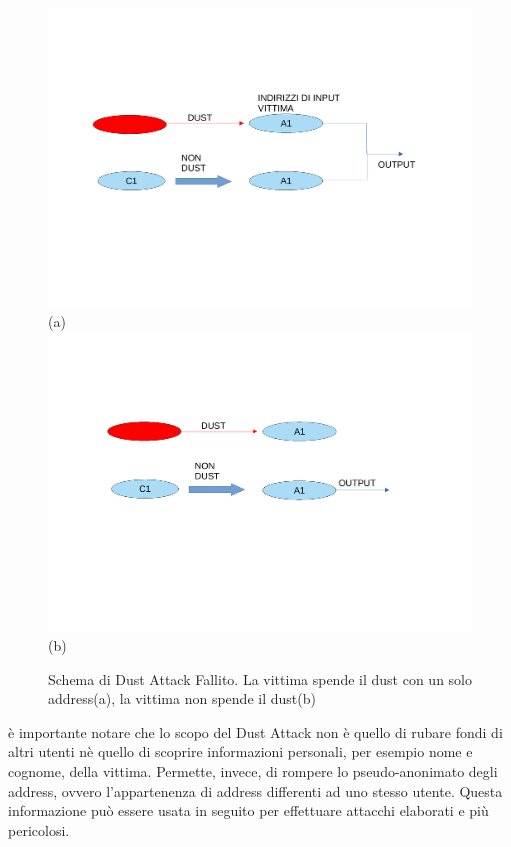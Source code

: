 \begin{figure}[h!]
    \centering
    \includegraphics[scale=0.5, trim = 1cm 6cm 0cm 3cm, clip]{Images/fallito2.pdf}
    (a)
    \includegraphics[scale=0.5, trim = 1cm 7cm 0cm 2cm, clip]{Images/fallito1.pdf}
    (b)
    \caption{Schema di Dust Attack Fallito. La vittima spende il dust con un solo address(a), la vittima non spende il dust(b)}
    \label{fig:fallito}
\end{figure}
\FloatBarrier

è importante notare che lo scopo del Dust Attack non è quello di rubare fondi di altri utenti nè quello di scoprire informazioni personali, per esempio nome e cognome, della vittima. Permette, invece, di rompere lo pseudo-anonimato degli address, ovvero l'appartenenza di address differenti ad uno stesso utente. Questa informazione può essere usata in seguito per effettuare attacchi elaborati e più pericolosi.

